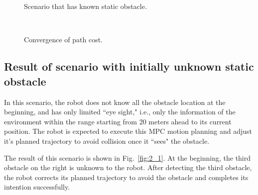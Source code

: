 \documentclass[letterpaper, 10 pt, conference]{ieeeconf}  %
\begin{document}
\begin{figure}[t]
      \centering
      \\
      \\
      
      \caption{Scenario that has known static obstacle.}
      
\end{figure}



\begin{figure}[t]
      \centering
      \\
      
      \caption{Convergence of path cost.}
      
\end{figure}



\subsection{Result of scenario with initially unknown static obstacle}
In this scenario, the robot does not know all the obstacle location at the beginning, and has only limited ``eye sight," i.e., only the information of the environment within the range starting from 20 meters ahead to its current position. The robot is expected to execute this MPC motion planning and adjust it's planned trajectory to avoid collision once it ``sees" the obstacle.

The result of this scenario is shown in Fig.~\ref{fig:2_1}. At the beginning, the third obstacle on the right is unknown to the robot. After detecting the third obstacle, the robot corrects its planned trajectory to avoid the obstacle and completes its intention successfully.
\end{document}
